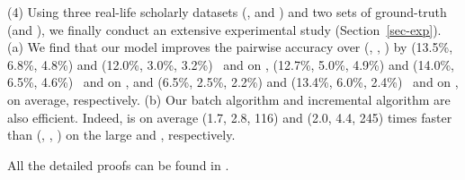 \sstab(4) Using three real-life scholarly datasets (\aan, \aminer and \magdata) and two sets of ground-truth (\recom and \fcita), we finally conduct an extensive experimental study (Section~\ref{sec-exp}).
(a) We find that our model \ensemblerank improves the pairwise accuracy \cite{Richardson06:BPR} over (\pagerank \cite{Brin98:PageRank}, \futurerank \cite{sayyadi09}, \hhgrank \cite{Liang16AAAI}) by
(13.5\%, 6.8\%, 4.8\%) and (12.0\%, 3.0\%, 3.2\%) \wrt\ \recom and \fcita  on \aan,
(12.7\%, 5.0\%, 4.9\%) and (14.0\%, 6.5\%, 4.6\%) \wrt\ \recom and \fcita on \aminer, and
(6.5\%, 2.5\%, 2.2\%) and (13.4\%, 6.0\%, 2.4\%) \wrt\ \recom and \fcita on \magdata, on average, respectively.
%
(b) Our batch algorithm \batensemble and incremental algorithm \incensemble are also efficient. Indeed, \incensemble is on average (1.7, 2.8, 116) and (2.0, 4.4, 245) times faster than (\batensemble, \futurerank, \hhgrank)  on the large \aminer and \magdata, respectively.

All the detailed proofs can be found in \cite{SARank-full}.




